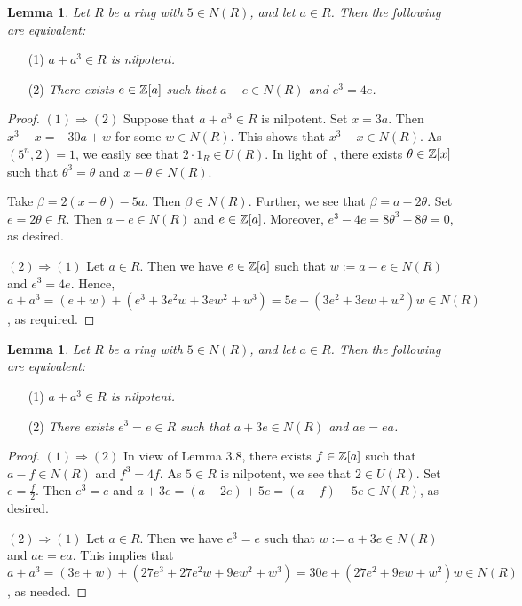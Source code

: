 \documentclass[12pt, reqno]{amsart}
\newtheorem{lem}[thm]{Lemma}
\numberwithin{equation}{section}
\begin{document}
\begin{lem} Let $R$ be a ring with $5\in N(R)$, and let $a\in R$. Then the following are equivalent:\end{lem}
\begin{enumerate}
\item [(1)]{\it $a+a^3\in R$ is nilpotent.}
\vspace{-.5mm}
\item [(2)]{\it There exists $e\in {\Bbb Z}[a]$ such that $a-e\in N(R)$ and $e^3=4e$.}
\end{enumerate}
\begin{proof} $(1)\Rightarrow (2)$ Suppose that $a+a^3\in R$ is nilpotent. Set $x=3a$. Then
$x^3-x=-30a+w$ for some $w\in N(R)$. This shows that $x^3-x\in N(R)$. As $(5^n,2)=1$, we easily see that $2\cdot 1_R\in U(R)$.
In light of~\cite[Lemma 2.6]{KWZ}, there exists $\theta\in {\Bbb Z}[x]$ such that $\theta^3=\theta$ and $x-\theta\in N(R)$.

Take $\beta=2(x-\theta)-5a$. Then $\beta\in N(R)$. Further, we see that $\beta=a-2\theta$.
Set $e=2\theta\in R$. Then $a-e\in N(R)$ and $e\in {\Bbb Z}[a]$. Moreover,
$e^3-4e=8\theta^3-8\theta=0$, as desired.

$(2)\Rightarrow (1)$ Let $a\in R$. Then we have $e\in {\Bbb Z}[a]$ such that $w:=a-e\in N(R)$ and $e^3=4e$. Hence, $a+a^3=(e+w)+(e^3+3e^2w+3ew^2+w^3)=5e+(3e^2+3ew+w^2)w\in N(R)$, as required.\end{proof}

\begin{lem} Let $R$ be a ring with $5\in N(R)$, and let $a\in R$. Then the following are equivalent:\end{lem}
\begin{enumerate}
\item [(1)]{\it $a+a^3\in R$ is nilpotent.}
\vspace{-.5mm}
\item [(2)]{\it There exists $e^3=e\in R$ such that $a+3e\in N(R)$ and $ae=ea$.}
\end{enumerate}
\begin{proof} $(1)\Rightarrow (2)$ In view of Lemma 3.8, there exists $f\in {\Bbb Z}[a]$ such that $a-f\in N(R)$ and
$f^3=4f$. As $5\in R$ is nilpotent, we see that $2\in U(R)$. Set $e=\frac{f}{2}$. Then $e^3=e$ and $a+3e=(a-2e)+5e=(a-f)+5e\in N(R)$, as desired.

$(2)\Rightarrow (1)$ Let $a\in R$. Then we have $e^3=e$ such that $w:=a+3e\in N(R)$ and $ae=ea$. This implies that
$a+a^3=(3e+w)+(27e^3+27e^2w+9ew^2+w^3)=30e+(27e^2+9ew+w^2)w\in N(R)$, as needed.\end{proof}
\end{document}

